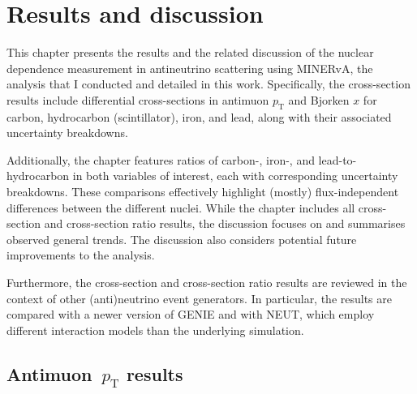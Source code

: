 \chapter{Results and discussion}

\label{ch:results} 


This chapter presents the results and the related discussion of the nuclear dependence measurement in antineutrino scattering using MINERvA, the analysis that I conducted and detailed in this work. Specifically, the cross-section results include differential cross-sections in antimuon $p_{\text{T}}$ and Bjorken $x$ for carbon, hydrocarbon (scintillator), iron, and lead, along with their associated uncertainty breakdowns.

Additionally, the chapter features ratios of carbon-, iron-, and lead-to-hydrocarbon in both variables of interest, each with corresponding uncertainty breakdowns. These comparisons effectively highlight (mostly) flux-independent differences between the different nuclei. While the chapter includes all cross-section and cross-section ratio results, the discussion focuses on and summarises observed general trends. The discussion also considers potential future improvements to the analysis.

Furthermore, the cross-section and cross-section ratio results are reviewed in the context of other (anti)neutrino event generators. In particular, the results are compared with a newer version of GENIE and with NEUT, which employ different interaction models than the underlying simulation.


\section{Antimuon~$p_{\text{T}}$ results}



